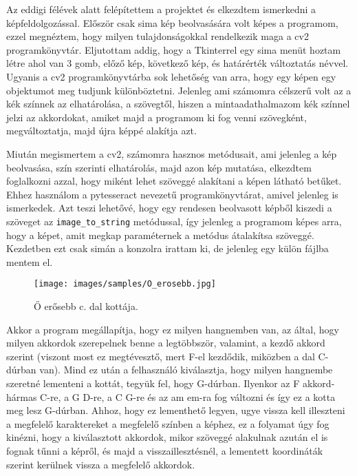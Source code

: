 
Az eddigi félévek alatt felépítettem a projektet és elkezdtem ismerkedni a képfeldolgozással. Először csak sima kép beolvasására volt képes a programom, ezzel megnéztem, hogy milyen tulajdonságokkal rendelkezik maga a cv2 programkönyvtár. Eljutottam addig, hogy a Tkinterrel egy sima menüt hoztam létre ahol van 3 gomb, előző kép, következő kép, és határérték változtatás névvel. Ugyanis a cv2 programkönyvtárba sok lehetőség van arra, hogy egy képen egy objektumot meg tudjunk különböztetni. Jelenleg ami számomra célszerű volt az a kék színnek az elhatárolása, a szövegtől, hiszen a mintaadathalmazom kék színnel jelzi az akkordokat, amiket majd a programom ki fog venni szövegként, megváltoztatja, majd újra képpé alakítja azt.
\par
Miután megismertem a cv2, számomra hasznos metódusait, ami jelenleg a kép beolvasása, szín szerinti elhatárolás, majd azon kép mutatása, elkezdtem foglalkozni azzal, hogy miként lehet szöveggé alakítani a képen látható betűket. Ehhez használom a pytesseract nevezetű programkönyvtárat, amivel jelenleg is ismerkedek. Azt teszi lehetővé, hogy egy rendesen beolvasott képből kiszedi a szöveget az \texttt{image\_to\_string} metódussal, így jelenleg a programom képes arra, hogy a képet, amit megkap paraméternek a metódus átalakítsa szöveggé. Kezdetben ezt csak simán a konzolra irattam ki, de jelenleg egy külön fájlba mentem el.

\begin{figure}[h]
	\texttt{[image: images/samples/O\_erosebb.jpg]}
	\caption{Ő erősebb c. dal kottája.}
	\label{fig:Dal1}
\end{figure}

\newpage
Akkor a program megállapítja, hogy ez milyen hangnemben van, az által, hogy milyen akkordok szerepelnek benne a legtöbbször, valamint, a kezdő akkord szerint (viszont most ez megtévesztő, mert F-el kezdődik, miközben a dal C-dúrban van). Mind ez után a felhasználó kiválasztja, hogy milyen hangnembe szeretné lementeni a kottát, tegyük fel, hogy G-dúrban. Ilyenkor az F akkord-hármas C-re, a G D-re, a C G-re és az am em-ra fog változni és így ez a kotta meg lesz G-dúrban. Ahhoz, hogy ez lementhető legyen, ugye vissza kell illeszteni a megfelelő karaktereket a megfelelő színben a képhez, ez a folyamat úgy fog kinézni, hogy a kiválasztott akkordok, mikor szöveggé alakulnak azután el is fognak tűnni a képről, és majd a visszaillesztésnél, a lementett koordináták szerint kerülnek vissza a megfelelő akkordok.